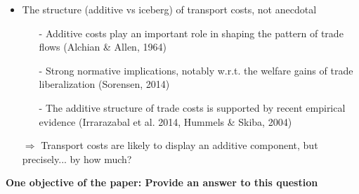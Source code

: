 \documentclass[10 pt,Helvetica, french]{beamer}
\begin{document}
\begin{frame}
\begin{itemize}
\item The structure (additive vs iceberg) of transport costs, not anecdotal \vspace{0.2cm}
\begin{itemize}
\item[-] Additive costs play an important role in shaping the pattern of trade flows (Alchian \& Allen, 1964) \vspace{0.1cm}
\item[-] Strong normative implications, notably w.r.t. the welfare gains of trade liberalization (Sorensen, 2014)\vspace{0.1cm}
\item[-] The additive structure of trade costs is supported by recent empirical evidence (Irrarazabal et al. 2014, Hummels \& Skiba, 2004)  \vspace{0.1cm}
\end{itemize}
\item[$\Rightarrow$] Transport costs are likely to display an additive component, but precisely... by how much? \vspace{0.2cm}
\end{itemize}
\textbf{One objective of the paper: Provide an answer to this question}

\end{frame}
\end{document}
